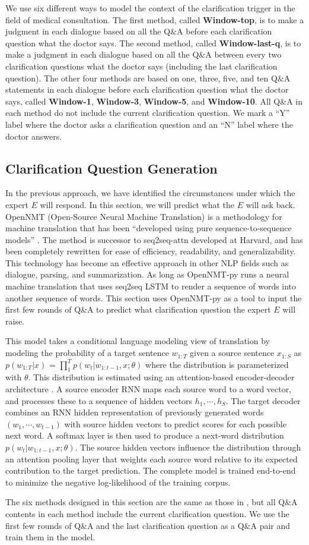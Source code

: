 We use six different ways to model the context of the clarification trigger in the field of medical consultation.
The first method, called \textbf{Window-top}, is to make a judgment in each dialogue based on all the Q$\&$A before each clarification question what the doctor says. The second method, called \textbf{Window-last-q}, is to make a judgment in each dialogue based on all the Q$\&$A between every two clarification questions what the doctor says (including the last clarification question). The other four methods are based on one, three, five, and ten Q$\&$A statements in each dialogue before each clarification question what the doctor says, called \textbf{Window-1}, \textbf{Window-3}, \textbf{Window-5}, and \textbf{Window-10}. All Q$\&$A in each method do not include the current clarification question. We mark a ``Y'' label where the doctor asks a clarification question and an ``N'' label where the doctor answers.

\subsection{Clarification Question Generation}
\label{sec:gen}
In the previous approach, we have identified the circumstances under which the expert $E$ will respond. In this section, we will predict what the $E$ will ask back.
OpenNMT (Open-Source Neural Machine Translation) is a methodology for machine translation that has been ``developed using pure sequence-to-sequence models'' \cite{DBLP:conf/acl/KleinKDSR17}. The method is successor to seq2seq-attn developed at Harvard, and has been completely rewritten for ease of efficiency, readability, and generalizability. This technology has become an effective approach in other NLP fields such as dialogue, parsing, and summarization. 
 As long as OpenNMT-py runs a neural machine translation that uses seq2seq LSTM to render a sequence of words into another sequence of words. This section uses OpenNMT-py as a tool to input the first few rounds of Q\&A to predict what clarification question the expert $E$ will raise.

This model takes a conditional language modeling view of translation by modeling the probability of a target sentence $w_{1:T}$ given a source sentence $x_{1:S}$ as 
$p\left( w_{1:T}|x \right)$ = $\prod_{1}^{T}p\left( w_{t}|w_{1:t-1},x;\theta \right)$ where the distribution is parameterized with $\theta$. This distribution is estimated using an attention-based encoder-decoder architecture \cite{DBLP:journals/corr/BahdanauCB14}. A source encoder RNN maps each source word to a word vector, and processes these to a sequence of hidden vectors $h_{1},\cdots,h_{S}$. The target decoder combines an RNN hidden representation of previously generated words $\left( w_{1},\cdots,w_{t-1} \right)$ with source hidden vectors to predict scores for each possible next word. A softmax layer is then used to produce a next-word distribution $p\left( w_{t}|w_{1:t-1},x;\theta \right)$. The source hidden vectors influence the distribution through an attention pooling layer that weights each source word relative to its expected contribution to the target prediction. The complete model is trained end-to-end to minimize the negative log-likelihood of the training corpus.

 The six methods designed in this section are the same as those in , but all Q\&A contents in each method include the current clarification question. We use the first few rounds of Q\&A and the last clarification question as a Q\&A pair and train them in the model. 
